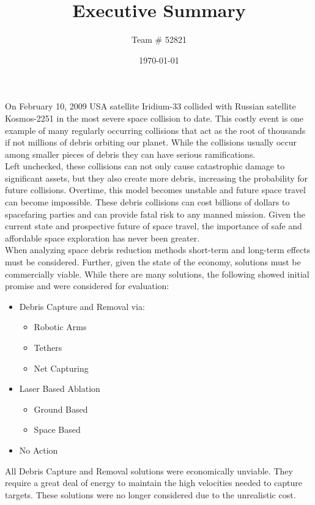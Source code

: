 \documentclass[notitlepage]{report}
\title{Executive Summary}
\author{Team \# 52821}
\date{\today}
\begin{document}
\maketitle
\thispagestyle{empty}

On February 10, 2009 USA satellite Iridium-33 collided with Russian satellite Kosmos-2251 in the most severe space collision to date. This costly event is one example of many regularly occurring collisions that act as the root of thousands if not millions of debris orbiting our planet. While the collisions usually occur among smaller pieces of debris they can have serious ramifications. \\


Left unchecked, these collisions can not only cause catastrophic damage to significant assets, but they also create more debris, increasing the probability for future collisions. Overtime, this model becomes unstable and future space travel can become impossible. These debris collisions can cost billions of dollars to spacefaring parties and can provide fatal risk to any manned mission. Given the current state and prospective future of space travel, the importance of safe and affordable space exploration has never been greater. \\

When analyzing space debris reduction methods short-term and long-term effects must be considered. Further, given the state of the economy, solutions must be commercially viable. While there are many solutions, the following showed initial promise and were considered for evaluation:
\begin{itemize}
	\item Debris Capture and Removal via:
	\begin{itemize}
		\item Robotic Arms
		\item Tethers
		\item Net Capturing
	\end{itemize}

	\item Laser Based Ablation
	\begin{itemize}
		\item Ground Based
		\item Space Based
	\end{itemize}
	\item No Action
\end{itemize}


All Debris Capture and Removal solutions were economically unviable. They require a great deal of energy to maintain the high velocities needed to capture targets. These solutions were no longer considered due to the unrealistic cost. \\
\end{document}
